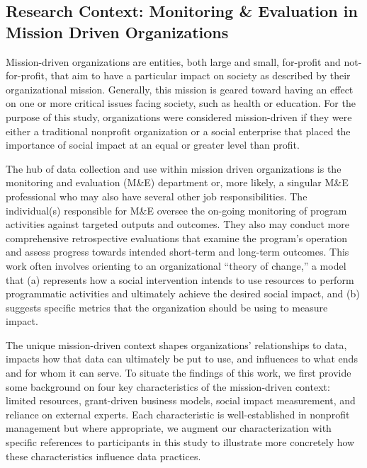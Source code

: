 \subsection{Research Context: Monitoring \& Evaluation in Mission Driven Organizations}
Mission-driven organizations are entities, both large and small, for-profit and not-for-profit, that aim to have a particular impact on society as described by their organizational mission. Generally, this mission is geared toward having an effect on one or more critical issues facing society, such as health or education. For the purpose of this study, organizations were considered mission-driven if they were either a traditional nonprofit organization or a social enterprise that placed the importance of social impact at an equal or greater level than profit.

The hub of data collection and use within mission driven organizations is the monitoring and evaluation (M\&E) department or, more likely, a singular M\&E professional who may also have several other job responsibilities. The individual(s) responsible for M\&E oversee the on-going monitoring of program activities against targeted outputs and outcomes. They also may conduct more comprehensive retrospective evaluations that examine the program’s operation and assess progress towards intended short-term and long-term outcomes. This work often involves orienting to an organizational “theory of change,” a model that (a) represents how a social intervention intends to use resources to perform programmatic activities and ultimately achieve the desired social impact, and (b) suggests specific metrics that the organization should be using to measure impact.

The unique mission-driven context shapes organizations’ relationships to data, impacts how that data can ultimately be put to use, and influences to what ends and for whom it can serve. To situate the findings of this work, we first provide some background on four key characteristics of the mission-driven context: limited resources, grant-driven business models, social impact measurement, and reliance on external experts. Each characteristic is well-established in nonprofit management but where appropriate, we augment our characterization with specific references to participants in this study to illustrate more concretely how these characteristics influence data practices.

